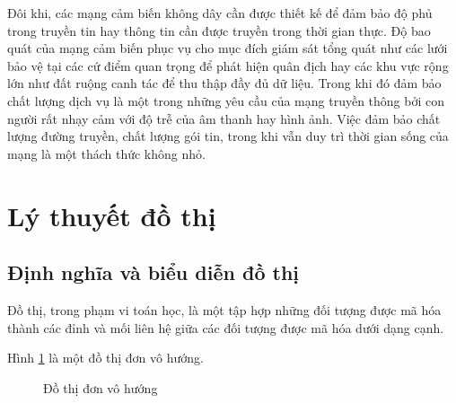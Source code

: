 \documentclass{hust}
\begin{document}
Đôi khi, các mạng cảm biến không dây cần được thiết kế để đảm bảo độ phủ trong truyền tin hay thông tin cần được truyền trong thời gian thực. Độ bao quát của mạng cảm biến phục vụ cho mục đích giám sát tổng quát như các lưới bảo vệ tại các cứ điểm quan trọng để phát hiện quân địch hay các khu vực rộng lớn như đất ruộng canh tác để thu thập đầy đủ dữ liệu. Trong khi đó đảm bảo chất lượng dịch vụ là một trong những yêu cầu của mạng truyền thông bởi con người rất nhạy cảm với độ trễ của âm thanh hay hình ảnh. Việc đảm bảo chất lượng đường truyền, chất lượng gói tin, trong khi vẫn duy trì thời gian sống của mạng là một thách thức không nhỏ.

\section{Lý thuyết đồ thị}
\subsection{Định nghĩa và biểu diễn đồ thị}
Đồ thị, trong phạm vi toán học, là một tập hợp những đối tượng được mã hóa thành các đỉnh và mối liên hệ giữa các đối tượng được mã hóa dưới dạng cạnh. 


Hình \ref{fig:undirected_graph} là một đồ thị đơn vô hướng.


\begin{figure}[htb]
	\caption{Đồ thị đơn vô hướng}\label{fig:undirected_graph}
\end{figure}
\end{document}
